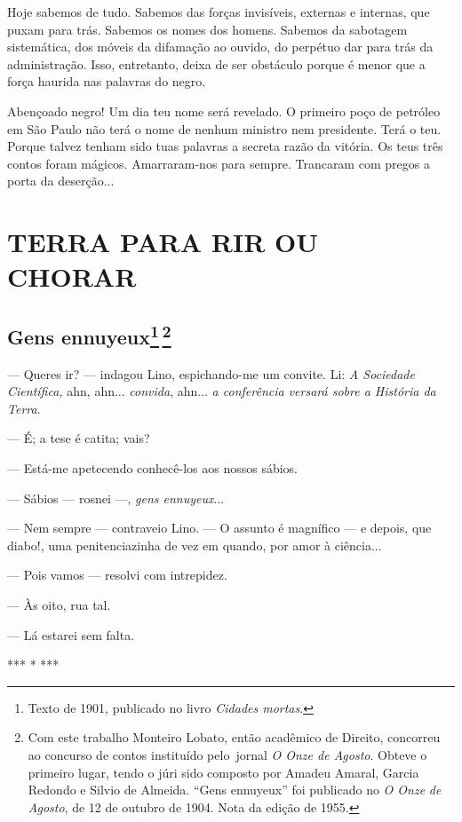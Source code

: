 Hoje sabemos de tudo. Sabemos das forças invisíveis, externas e
internas, que puxam para trás. Sabemos os nomes dos homens. Sabemos da
sabotagem sistemática, dos móveis da difamação ao ouvido, do perpétuo
dar para trás da administração. Isso, entretanto, deixa de ser obstáculo
porque é menor que a força haurida nas palavras do negro.

Abençoado negro! Um dia teu nome será revelado. O primeiro poço de
petróleo em São Paulo não terá o nome de nenhum ministro nem presidente.
Terá o teu. Porque talvez tenham sido tuas palavras a secreta razão da
vitória. Os teus três contos foram mágicos. Amarraram-nos para sempre.
Trancaram com pregos a porta da deserção...

\part{TERRA PARA RIR OU CHORAR}

\chapter{Gens ennuyeux\footnote[*]{Texto de 1901, publicado no livro \emph{Cidades mortas}.}\,\footnote[**]{Com este trabalho Monteiro
  Lobato, então acadêmico de Direito, concorreu ao concurso de contos
  instituído pelo~jornal \emph{O Onze de Agosto}. Obteve o primeiro
  lugar, tendo o júri sido composto por Amadeu Amaral, Garcia Redondo e
  Silvio de Almeida. ``Gens ennuyeux'' foi publicado no \emph{O Onze}
  \emph{de Agosto}, de 12 de outubro de 1904. Nota da edição de 1955.}}

--- Queres ir? --- indagou Lino, espichando-me um convite. Li: \emph{A
Sociedade Científica,} ahn, ahn... \emph{convida}, ahn... \emph{a
conferência versará sobre a História da Terra}.

--- É; a tese é catita; vais?

--- Está-me apetecendo conhecê-los aos nossos sábios.

--- Sábios --- rosnei ---, \emph{gens ennuyeux}...

--- Nem sempre --- contraveio Lino. --- O assunto é magnífico --- e
depois, que diabo!, uma penitenciazinha de vez em quando, por amor à
ciência...

--- Pois vamos --- resolvi com intrepidez.

--- Às oito, rua tal.

--- Lá estarei sem falta.

*** * ***

